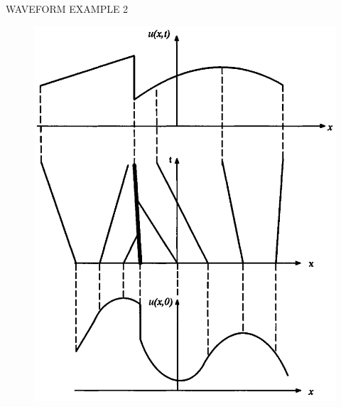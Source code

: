 \documentclass{beamer}
\begin{document}
\begin{frame}{WAVEFORM EXAMPLE 2}
  \begin{figure}
   \includegraphics[scale=0.20]{figures/Destruction.jpg}
  \end{figure}
\end{frame}
\end{document}
